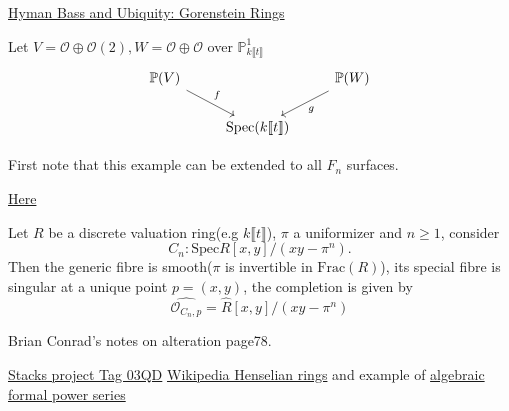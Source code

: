 \documentclass[../main.tex]{subfiles}
\begin{document}
\begin{example}
\href{https://arxiv.org/pdf/math/0209199.pdf}{Hyman Bass and Ubiquity: Gorenstein Rings}
\end{example}

\begin{example}

\end{example}

\begin{example}

\end{example}

\begin{example}
Let $V=\mathcal{O}\oplus\mathcal{O}(2), W=\mathcal{O}\oplus\mathcal{O}$ over $\mathbb{P}^{1}_{k\llbracket t\rrbracket}$
$$\begin{tikzcd} \mathbb{P}(V)\arrow{rd}{f} & & \mathbb{P}(W)\arrow{dl}{g} \\
&\mathrm{Spec}(k\llbracket t\rrbracket) &\end{tikzcd}$$
\end{example}
\begin{remark}
First note that this example can be extended to all $F_{n}$ surfaces. 
\end{remark}
\begin{example}
\href{https://mathoverflow.net/questions/75393/does-isomorphic-generic-fibre-imply-isomorphic-special-fibre-for-smooth-morphism}{Here}
\end{example}
\begin{example}
Let $R$ be a discrete valuation ring(e.g $k\llbracket t\rrbracket$), $\pi$ a uniformizer and $n\geq 1$, consider 
$$C_{n}:\mathrm{Spec}R[x,y]/(xy-\pi^{n}).$$
Then the generic fibre is smooth($\pi$ is invertible in $\mathrm{Frac}(R)$), its special fibre is singular at a unique point $p=(x,y)$, the completion is given by 
$$\widehat{\mathscr{O}_{C_{n},p}}=\widehat{R}[x,y]/(xy-\pi^{n})$$

Brian Conrad's notes on alteration page78.
\end{example}
\begin{example}[Henselization]
\href{http://stacks.math.columbia.edu/tag/03QD}{Stacks project Tag 03QD}
\href{https://en.wikipedia.org/wiki/Henselian_ring}{Wikipedia Henselian rings} and example of \href{https://math.stackexchange.com/questions/2143409/algebraic-formal-power-series}{algebraic formal power series}
\end{example}
\end{document}
